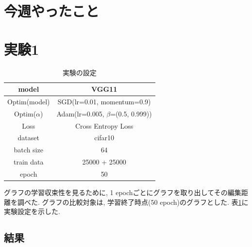 \documentclass[twocolumn]{jarticle}     %
\begin{document}


\section{今週やったこと}

\section{実験1}

\begin{table}[tb]
  \begin{center}
    \caption{実験の設定}
    \begin{tabular}{|c|c|} \hline
      model & VGG11 \\ \hline
      Optim(model) & SGD(lr=0.01, momentum=0.9) \\ \hline
      Optim($\alpha$) & Adam(lr=0.005, $\beta$=(0.5, 0.999)) \\ \hline
      Loss & Cross Entropy Loss \\ \hline
      dataset & cifar10 \\ \hline
      batch size & 64 \\ \hline
      train data & 25000 + 25000 \\ \hline
      epoch & 50 \\ \hline
    \end{tabular}
    \label{tab:setting}
  \end{center}
\end{table}

グラフの学習収束性を見るために, 1 epochごとにグラフを取り出してその編集距離を調べた.
グラフの比較対象は, 学習終了時点(50 epoch)のグラフとした.
表\ref{tab:setting}に実験設定を示した.

\subsection{結果}
\end{document}
